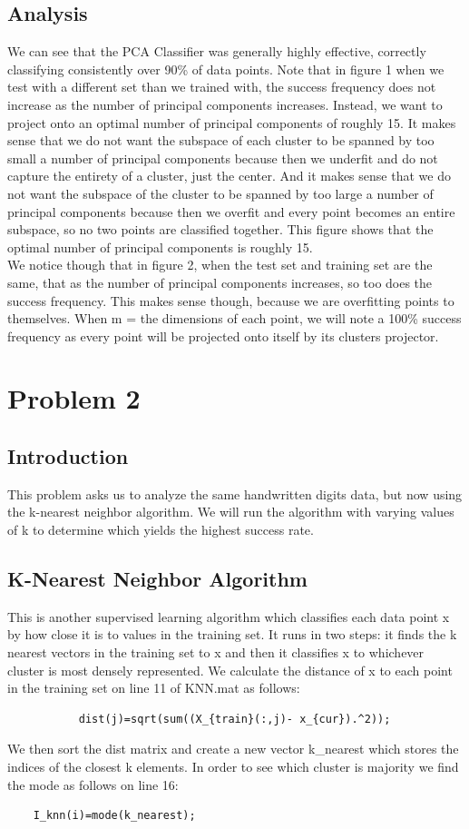 \documentclass{article}
\begin{document}
\subsection*{Analysis}
We can see that the PCA Classifier was generally highly effective, correctly classifying consistently over 90\% of data points.  Note that in figure 1 when we test with a different set than we trained with, the success frequency does not increase as the number of principal components increases.  Instead, we want to project onto an optimal number of principal components of roughly 15.  It makes sense that we do not want the subspace of each cluster to be spanned by too small a number of principal components  because then we underfit and do not capture the entirety of a cluster, just the center.  And it makes sense that we do not want the subspace of the cluster to be spanned by too large a number of principal components because then we overfit and every point becomes an entire subspace, so no two points are classified together.  This figure shows that the optimal number of principal components is roughly 15.
\\We notice though that in figure 2, when the test set and training set are the same, that as the number of principal components increases, so too does the success frequency. This makes sense though, because we are overfitting points to themselves. When m = the dimensions of each point, we will note a 100\% success frequency as every point will be projected onto itself by its clusters projector.  

\section*{Problem 2}
\subsection*{Introduction}
This problem asks us to analyze the same handwritten digits data, but now using the k-nearest neighbor algorithm.  We will run the algorithm with varying values of k to determine which yields the highest success rate.  

\subsection*{K-Nearest Neighbor Algorithm}
This is another supervised learning algorithm which classifies each data point x by how close it is to values in the training set.  It runs in two steps: it finds the k nearest vectors in the training set to x and then it classifies x to whichever cluster is most densely represented.  We calculate the distance of x to each point in the training set on line 11 of KNN.mat as follows:
\begin{verbatim}
           dist(j)=sqrt(sum((X_{train}(:,j)- x_{cur}).^2));

\end{verbatim}
We then sort the dist matrix and create a new vector k\_nearest which stores the indices of the closest k elements.  In order to see which cluster is majority we find the mode as follows on line 16: 
\begin{verbatim}
    I_knn(i)=mode(k_nearest);
\end{verbatim}
\end{document}
